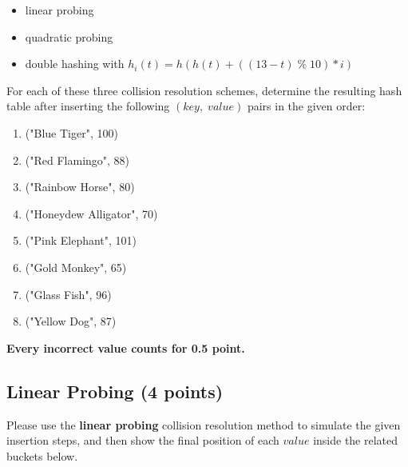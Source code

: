 \documentclass[11pt]{exam}
\begin{document}
\begin{itemize}
    \item linear probing
    \item quadratic probing
    \item double hashing with $h_i(t) = h(h(t)+((13-t)\;\%\; 10) * i)$
\end{itemize}

For each of these three collision resolution schemes, determine the resulting hash table after inserting the following $(key,\;value)$ pairs in the given order:
\begin{enumerate}[1.]
    \item ("Blue Tiger", 100)
    \item ("Red Flamingo", 88)
    \item ("Rainbow Horse", 80)
    \item ("Honeydew Alligator", 70)
    \item ("Pink Elephant", 101)
    \item ("Gold Monkey", 65)
    \item ("Glass Fish", 96)
    \item ("Yellow Dog", 87)
\end{enumerate}

\textbf{Every incorrect value counts for 0.5 point.}
\subsection{Linear Probing (4 points)}
Please use the \textbf{linear probing} collision resolution method to simulate the given insertion steps, and then show the final position of each $value$ inside the related buckets below.
\begin{solution}
    \begin{table}[H]
        \centering
        \renewcommand{\arraystretch}{2}
    \end{table}
\end{solution}
\end{document}
